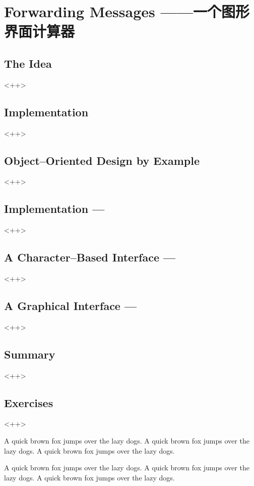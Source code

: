 

\chapter{Forwarding Messages ——一个图形界面计算器}
\label{ch:ForwardingMessages}

\section{The Idea}<++>

\section{Implementation}<++>

\section{Object--Oriented Design by Example}<++>

\section{Implementation ---}<++>

\section{A Character--Based Interface ---}<++>

\section{A Graphical Interface ---}<++>

\section{Summary}<++>

\section{Exercises}<++>

A quick brown fox jumps over the lazy dogs.
A quick brown fox jumps over the lazy dogs.
A quick brown fox jumps over the lazy dogs.

A quick brown fox jumps over the lazy dogs.
A quick brown fox jumps over the lazy dogs.
A quick brown fox jumps over the lazy dogs.


